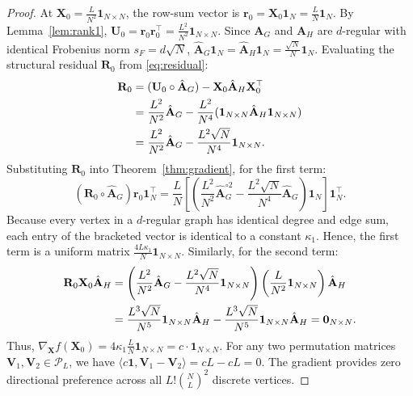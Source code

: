 \documentclass[conference]{IEEEtran}
\begin{document}
\begin{proof}
At $\mathbf{X}_0 = \frac{L}{N^2}\mathbf{1}_{N \times N}$, the row-sum vector is $\mathbf{r}_0 = \mathbf{X}_0 \mathbf{1}_N = \frac{L}{N}\mathbf{1}_N$. By Lemma~\ref{lem:rank1}, $\mathbf{U}_0 = \mathbf{r}_0 \mathbf{r}_0^\top = \frac{L^2}{N^2}\mathbf{1}_{N \times N}$. Since $\mathbf{A}_G$ and $\mathbf{A}_H$ are $d$-regular with identical Frobenius norm $s_F = d\sqrt{N}$, $\hat{\mathbf{A}}_G \mathbf{1}_N = \hat{\mathbf{A}}_H \mathbf{1}_N = \frac{\sqrt{N}}{N}\mathbf{1}_N$.
Evaluating the structural residual $\mathbf{R}_0$ from \eqref{eq:residual}:
\begin{align}
\mathbf{R}_0 &= (\mathbf{U}_0 \circ \hat{\mathbf{A}}_G) - \mathbf{X}_0 \hat{\mathbf{A}}_H \mathbf{X}_0^\top \notag\\
&= \frac{L^2}{N^2} \hat{\mathbf{A}}_G - \frac{L^2}{N^4} (\mathbf{1}_{N\times N} \hat{\mathbf{A}}_H \mathbf{1}_{N\times N}) \notag\\
&= \frac{L^2}{N^2} \hat{\mathbf{A}}_G - \frac{L^2 \sqrt{N}}{N^4} \mathbf{1}_{N\times N}.
\end{align}
Substituting $\mathbf{R}_0$ into Theorem~\ref{thm:gradient}, for the first term:
\begin{equation}
(\mathbf{R}_0 \circ \hat{\mathbf{A}}_G)\mathbf{r}_0 \mathbf{1}_N^\top = \frac{L}{N} \left[ \left( \frac{L^2}{N^2} \hat{\mathbf{A}}_G^{\circ 2} - \frac{L^2\sqrt{N}}{N^4} \hat{\mathbf{A}}_G \right)\mathbf{1}_N \right] \mathbf{1}_N^\top.
\end{equation}
Because every vertex in a $d$-regular graph has identical degree and edge sum, each entry of the bracketed vector is identical to a constant $\kappa_1$. Hence, the first term is a uniform matrix $\frac{4 L \kappa_1}{N}\mathbf{1}_{N \times N}$.
Similarly, for the second term:
\begin{align}
\mathbf{R}_0 \mathbf{X}_0 \hat{\mathbf{A}}_H &= \left( \frac{L^2}{N^2}\hat{\mathbf{A}}_G - \frac{L^2\sqrt{N}}{N^4}\mathbf{1}_{N\times N} \right) \left( \frac{L}{N^2}\mathbf{1}_{N\times N} \right) \hat{\mathbf{A}}_H \notag\\
&= \frac{L^3 \sqrt{N}}{N^5} \mathbf{1}_{N\times N} \hat{\mathbf{A}}_H - \frac{L^3\sqrt{N}}{N^5} \mathbf{1}_{N\times N} \hat{\mathbf{A}}_H = \mathbf{0}_{N \times N}.
\end{align}
Thus, $\nabla_{\mathbf{X}} f(\mathbf{X}_0) = 4\kappa_1 \frac{L}{N} \mathbf{1}_{N \times N} = c \cdot \mathbf{1}_{N \times N}$. For any two permutation matrices $\mathbf{V}_1, \mathbf{V}_2 \in \mathcal{P}_L$, we have $\langle c \mathbf{1}, \mathbf{V}_1 - \mathbf{V}_2 \rangle = c L - c L = 0$. The gradient provides zero directional preference across all $L! \binom{N}{L}^2$ discrete vertices.
\end{proof}
\end{document}
